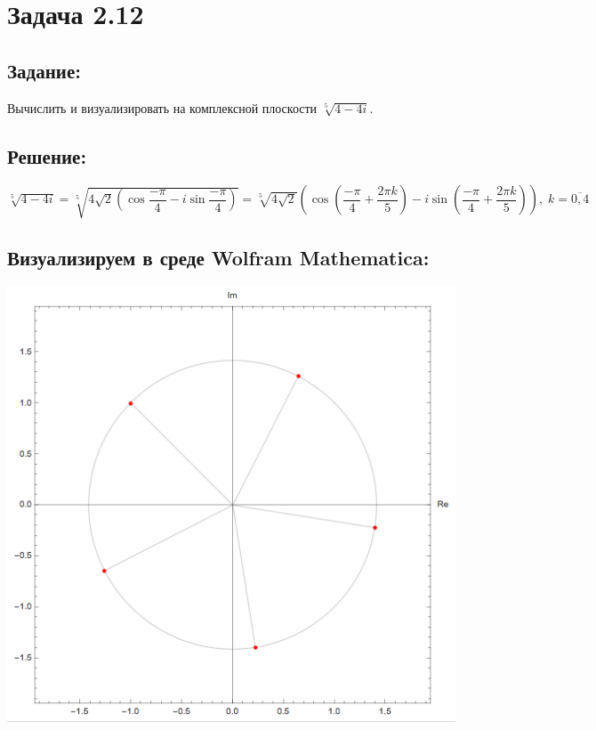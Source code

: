 \section{Задача 2.12}
\subsection{Задание:}
Вычислить и визуализировать на комплексной плоскости $ \sqrt[5]{4 - 4i} $.
\subsection{Решение:}
$
	\sqrt[5]{4 - 4i}
	=
	\sqrt[5]{4 \sqrt{2} \left( \cos \dfrac{-\pi}{4} - i \sin \dfrac{-\pi}{4} \right)}
	=
	\sqrt[5]{4 \sqrt{2}} \left( \cos \left( \dfrac{-\pi}{4} + \dfrac{2\pi k}{5} \right) -
	i \sin \left( \dfrac{-\pi}{4} + \dfrac{2\pi k}{5} \right) \right), \; k = \overline{0,4}
$
\subsection{Визуализируем в среде Wolfram Mathematica:}
\includegraphics[scale=0.6]{task/2_12/screen.png}
